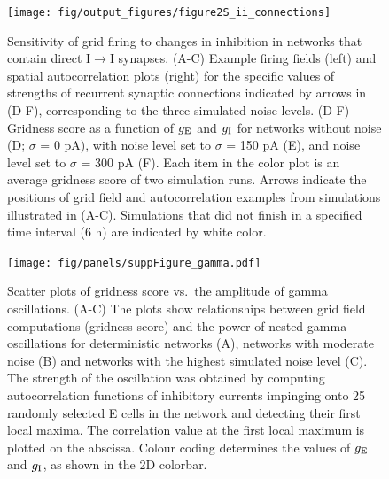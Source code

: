 \documentclass[a4paper,12pt]{article}
\newcommand{\ssc}[3]{\ensuremath{#1_{\text{#2}_{\text{#3}}}}}
\newcommand{\gE      }{\ssc{g}      {\scriptsize{E}}{}}
\newcommand{\gI      }{\ssc{g}      {\scriptsize{I}}{}}
\begin{document}
\begin{figure}[p]
    \internallinenumbers
    \centering
        \texttt{[image: fig/output\_figures/figure2S\_ii\_connections]}
    \caption{Sensitivity of grid firing to changes in inhibition in networks
    that contain direct I$\rightarrow$I synapses. (A-C) Example
    firing fields (left) and spatial autocorrelation plots (right) for the
    specific values of strengths of recurrent synaptic connections indicated by
    arrows in (D-F), corresponding to the three simulated noise levels.  (D-F)
    Gridness score as a function of $\gE$ and $\gI$ for networks without noise (D;
    $\sigma$ = 0 pA), with noise level set to $\sigma$ = 150 pA (E), and noise
    level set to $\sigma$ = 300 pA (F). Each item in the color plot is an
    average gridness score of two simulation runs. Arrows indicate the
    positions of grid field and autocorrelation examples from simulations
    illustrated in (A-C). Simulations that did not finish in a specified time
    interval (6 h) are indicated by white color.}
\end{figure}

\clearpage

\begin{figure}[p]
    \internallinenumbers
    \centering
    \caption{}
\end{figure}

\clearpage

\begin{figure}[p]
    \internallinenumbers
    \centering
    \caption{}
\end{figure}

\clearpage

\setcounter{figure}{0}
\renewcommand{\figurename}{Figure 3 - figure supplement}

\begin{figure}[p]
    \internallinenumbers
    \centering
        \texttt{[image: fig/panels/suppFigure\_gamma.pdf]}
    \caption{Scatter plots of gridness score vs.\ the amplitude of gamma
    oscillations. (A-C) The plots show relationships between grid field
    computations (gridness score) and the power of nested gamma oscillations
    for deterministic networks (A), networks with moderate noise (B) and
    networks with the highest simulated noise level (C).
    The strength of the oscillation was obtained
    by computing autocorrelation functions of inhibitory currents impinging
    onto 25 randomly selected E cells in the network and detecting their first
    local maxima. The correlation value at the first local maximum is plotted
    on the abscissa. Colour coding determines the values of $\gE$ and $\gI$, as
    shown in the 2D colorbar.}
\end{figure}
\end{document}
